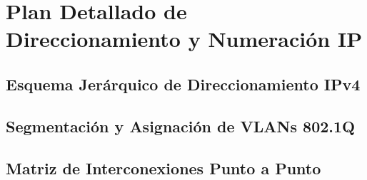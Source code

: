 \section{Plan Detallado de Direccionamiento y Numeración IP}
\label{sec:plan_direccionamiento}

\subsection{Esquema Jerárquico de Direccionamiento IPv4}
\label{subsec:esquema_ipv4}

\subsection{Segmentación y Asignación de VLANs 802.1Q}
\label{subsec:segmentacion_vlans}

\subsection{Matriz de Interconexiones Punto a Punto}
\label{subsec:matriz_p2p}
